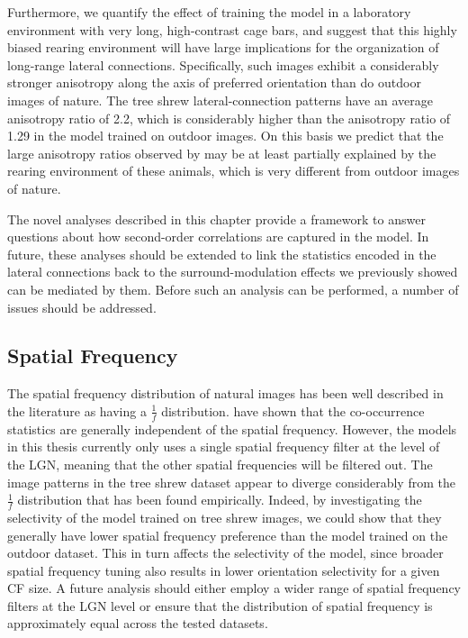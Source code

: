 Furthermore, we quantify the effect of training the model in a
laboratory environment with very long, high-contrast cage bars, and
suggest that this highly biased rearing environment will have large
implications for the organization of long-range lateral connections.
Specifically, such images exhibit a considerably stronger anisotropy
along the axis of preferred orientation than do outdoor images of
nature.  The tree shrew lateral-connection patterns have an average
anisotropy ratio of 2.2, which is considerably higher than the
anisotropy ratio of 1.29 in the model trained on outdoor images. On
this basis we predict that the large anisotropy ratios observed by
\citep{Bosking1997} may be at least partially explained by the rearing
environment of these animals, which is very different from outdoor
images of nature.

The novel analyses described in this chapter provide a framework to
answer questions about how second-order correlations are captured in
the model. In future, these analyses should be extended to link the
statistics encoded in the lateral connections back to the
surround-modulation effects we previously showed can be mediated by
them. Before such an analysis can be performed, a number of issues
should be addressed.

\subsection{Spatial Frequency}

The spatial frequency distribution of natural images has been well
described in the literature as having a $\frac{1}{f}$
distribution. \cite{Perrinet2015} have shown that the co-occurrence
statistics are generally independent of the spatial
frequency. However, the models in this thesis currently only uses a
single spatial frequency filter at the level of the LGN, meaning that
the other spatial frequencies will be filtered out. The image patterns
in the tree shrew dataset appear to diverge considerably from the
$\frac{1}{f}$ distribution that has been found empirically. Indeed, by
investigating the selectivity of the model trained on tree shrew
images, we could show that they generally have lower spatial frequency
preference than the model trained on the outdoor dataset. This in turn
affects the selectivity of the model, since broader spatial frequency
tuning also results in lower orientation selectivity for a given CF
size. A future analysis should either employ a wider range of spatial
frequency filters at the LGN level or ensure that the distribution of
spatial frequency is approximately equal across the tested datasets.

